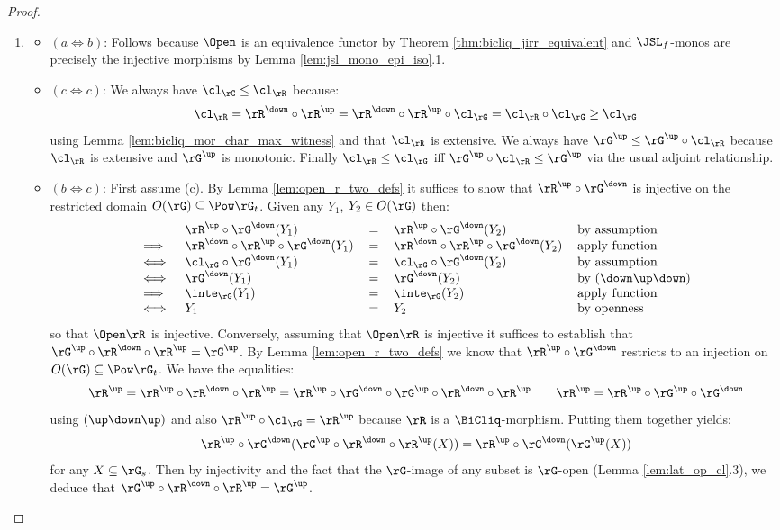 \documentclass{article}
\begin{document}
\begin{proof}
\item
\begin{enumerate}
\item
\begin{itemize}
\item
$(a \iff b)$: Follows because $\Open$ is an equivalence functor by Theorem \ref{thm:bicliq_jirr_equivalent} and $\JSL_f$-monos are precisely the injective morphisms by Lemma \ref{lem:jsl_mono_epi_iso}.1.

\item
$(c \iff c)$: We always have $\cl_\rG \leq \cl_\rR$ because:
\[
\cl_\rR
= \rR^\down \circ \rR^\up 
= \rR^\down \circ \rR^\up \circ \cl_\rG
= \cl_\rR \circ \cl_\rG
\geq \cl_\rG
\]
using Lemma \ref{lem:bicliq_mor_char_max_witness} and that $\cl_\rR$ is extensive. We always have $\rG^\up \leq \rG^\up \circ \cl_\rR$ because $\cl_\rR$ is extensive and $\rG^\up$ is monotonic. Finally $\cl_\rR \leq \cl_\rG$ iff $\rG^\up \circ \cl_\rR \leq \rG^\up$ via the usual adjoint relationship.

\item
$(b \iff c)$: First assume (c). By Lemma \ref{lem:open_r_two_defs} it suffices to show that $\rR^\up \circ \rG^\down$ is injective on the restricted domain $O(\rG) \subseteq \Pow \rG_t$. Given any $Y_1$, $Y_2 \in O(\rG)$ then:
\[
\begin{tabular}{lllll}
& $\rR^\up \circ \rG^\down(Y_1)$ & $=$ & $\rR^\up \circ \rG^\down(Y_2)$
& by assumption
\\
$\implies$ & $\rR^\down \circ \rR^\up \circ \rG^\down(Y_1)$ & $=$ & $\rR^\down \circ \rR^\up \circ \rG^\down(Y_2)$
& apply function
\\
$\iff$ & $\cl_\rG \circ \rG^\down(Y_1)$ & $=$ & $\cl_\rG \circ \rG^\down(Y_2)$
& by assumption
\\
$\iff$ & $\rG^\down(Y_1)$ & $=$ & $\rG^\down(Y_2)$
& by $(\down\up\down)$
\\
$\implies$ & $\inte_\rG(Y_1)$ & $=$ & $\inte_\rG(Y_2)$
& apply function
\\
$\iff$ & $Y_1$ & $=$ & $Y_2$
& by openness
\end{tabular}
\]
so that $\Open\rR$ is injective. Conversely, assuming that $\Open\rR$ is injective it suffices to establish that $\rG^\up \circ \rR^\down \circ \rR^\up = \rG^\up$. By Lemma \ref{lem:open_r_two_defs} we know that $\rR^\up \circ \rG^\down$ restricts to an injection on $O(\rG) \subseteq \Pow\rG_t$. We have the equalities:
\[
\rR^\up 
= \rR^\up \circ \rR^\down \circ \rR^\up
= \rR^\up \circ \rG^\down \circ \rG^\up \circ \rR^\down \circ \rR^\up
\qquad
\rR^\up
= \rR^\up \circ \rG^\up \circ \rG^\down
\]
using $(\up\down\up)$ and also $\rR^\up \circ \cl_\rG = \rR^\up$ because $\rR$ is a $\BiCliq$-morphism. Putting them together yields:
\[
\rR^\up \circ \rG^\down (\rG^\up \circ \rR^\down \circ \rR^\up(X))
= \rR^\up \circ \rG^\down (\rG^\up(X))
\]
for any $X \subseteq \rG_s$. Then by injectivity and the fact that the $\rG$-image of any subset is $\rG$-open (Lemma \ref{lem:lat_op_cl}.3), we deduce that $\rG^\up \circ \rR^\down \circ \rR^\up = \rG^\up$.
\end{itemize}


\end{enumerate}
\end{proof}
\end{document}

